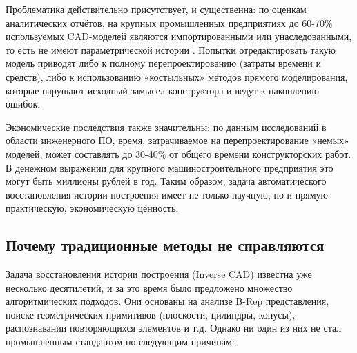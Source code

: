Проблематика действительно присутствует, и существенна: по оценкам аналитических отчётов, на крупных промышленных предприятиях до 60-70\% используемых CAD-моделей являются импортированными или унаследованными, то есть не имеют параметрической истории \cite{kim2023reconstruction}. Попытки отредактировать такую модель приводят либо к полному перепроектированию (затраты времени и средств), либо к использованию «костыльных» методов прямого моделирования, которые нарушают исходный замысел конструктора и ведут к накоплению ошибок.

Экономические последствия также значительны: по данным исследований в области инженерного ПО, время, затрачиваемое на перепроектирование «немых» моделей, может составлять до 30-40\% от общего времени конструкторских работ. В денежном выражении для крупного машиностроительного предприятия это могут быть миллионы рублей в год. Таким образом, задача автоматического восстановления истории построения имеет не только научную, но и прямую практическую, экономическую ценность.

\subsection{Почему традиционные методы не справляются}

Задача восстановления истории построения (Inverse CAD) известна уже несколько десятилетий, и за это время было предложено множество алгоритмических подходов. Они основаны на анализе B-Rep представления, поиске геометрических примитивов (плоскости, цилиндры, конусы), распознавании повторяющихся элементов и т.д. Однако ни один из них не стал промышленным стандартом по следующим причинам:

